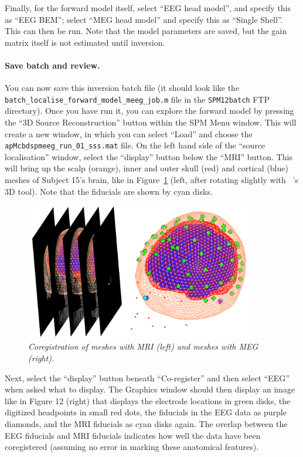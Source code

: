 Finally, for the forward model itself, select ``EEG head model'', and specify this as ``EEG BEM''; select ``MEG head model'' and specify this as ``Single Shell''. This can then be run. Note that the model parameters are saved, but the gain matrix itself is not estimated until inversion.

\paragraph{Save batch and review.}

You can now save this inversion batch file (it should look like the \texttt{batch\_localise\_forward\_model\_meeg\_job.m} file in the \texttt{SPM12batch} FTP directory). Once you have run it, you can explore the forward model by pressing the ``3D Source Reconstruction'' button within the SPM Menu window. This will create a new window, in which you can select ``Load'' and choose the \texttt{apMcbdspmeeg\_run\_01\_sss.mat} file.  On the left hand side of the ``source localisation'' window, select the ``display'' button below the ``MRI'' button. This will bring up the scalp (orange), inner and outer skull (red) and cortical (blue) meshes of Subject 15's brain, like in Figure~\ref{multi:fig:12} (left, after rotating slightly with \matlab\ 's 3D tool). Note that the fiducials are shown by cyan disks. 

\begin{figure}
\begin{center}
\includegraphics[width=100mm]{multi/figures/figure12}
\caption{\em Coregistration of meshes with MRI (left) and meshes with MEG (right). \label{multi:fig:12}}
\end{center}
\end{figure}

Next, select the ``display'' button beneath ``Co-register'' and then select ``EEG'' when asked  what to display. The Graphics window should then display an image like in Figure 12 (right) that displays the electrode locations in green disks, the digitized headpoints in small red dots, the fiducials in the EEG data as purple diamonds, and the MRI fiducials as cyan disks again. The overlap between the EEG fiducials and MRI fiducials indicates how well the data have been coregistered (assuming no error in marking these anatomical features). 

